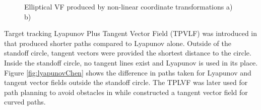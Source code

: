 \documentclass[numbered,pdftex]{ohio-etd}
\begin{document}
\begin{figure}[h]
	\begin{subfigmatrix}{2}%
		\centering
	\end{subfigmatrix}
	\caption{Elliptical VF produced by non-linear coordinate transformations a)\cite{frew_lyapunov_nodate} b)\cite{frew_cooperative_2007}}
	\label{fig:lyapunovFrew}
\end{figure}

Target tracking Lyapunov Plus Tangent Vector Field (TPVLF) was introduced in \cite{chen_tracking_2009} that produced shorter paths compared to Lyapunov alone. Outside of the standoff circle, tangent vectors were provided the shortest distance to the circle. Inside the standoff circle, no tangent lines exist and Lyapunov is used in its place. Figure \ref{fig:lyapunovChen} shows the difference in paths taken for Lyapunov and tangent vector fields outside the standoff circle. The TPLVF was later used for path planning to avoid obstacles in \cite{chen_uav_2013} while \cite{liang_tangent_2017} constructed a tangent vector field for curved paths.
\end{document}
